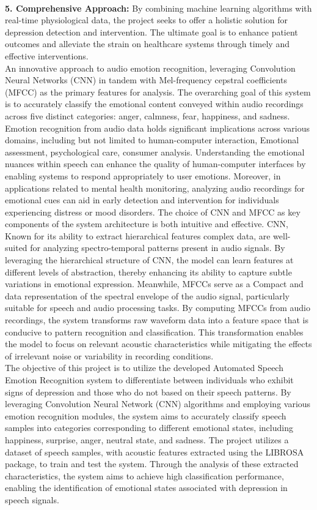 \\
\textbf{5. Comprehensive Approach:}
By combining machine learning algorithms with real-time physiological data, the project seeks to offer a holistic solution for depression detection and intervention.
The ultimate goal is to enhance patient outcomes and alleviate the strain on healthcare systems through timely and effective interventions.
\\
An innovative approach to audio emotion recognition, leveraging Convolution Neural Networks\cite{li2021survey} (CNN) in tandem with Mel-frequency cepstral coefficients (MFCC) as the primary features for analysis. The overarching goal of this system is to accurately classify the emotional content conveyed within audio recordings across five distinct categories: anger, calmness, fear, happiness, and sadness. Emotion recognition from audio data holds significant implications across various domains, including but not limited to human-computer interaction, Emotional assessment, psychological care, consumer analysis. Understanding the emotional nuances within speech can enhance the quality of human-computer interfaces by enabling systems to respond appropriately to user emotions. Moreover, in applications related to mental health monitoring, analyzing audio recordings for emotional cues can aid in early detection and intervention for individuals experiencing distress or mood disorders. The choice of CNN and MFCC as key components of the system architecture is both intuitive and effective. CNN, Known for its ability to extract hierarchical features complex data, are well-suited for analyzing spectro-temporal patterns present in audio signals. By leveraging the hierarchical structure of CNN, the model can learn  features at different levels of abstraction, thereby enhancing its ability to capture subtle variations in emotional expression. Meanwhile, MFCCs serve as a Compact and data representation of the spectral envelope of the audio signal, particularly suitable for speech and audio processing tasks. By computing MFCCs from audio recordings, the system transforms raw waveform data into a feature space that is conducive to pattern recognition and classification. This transformation enables the model to focus on relevant acoustic characteristics while mitigating the effects of irrelevant noise or variability in recording conditions.
\\
The objective of this project is to utilize the developed Automated Speech Emotion Recognition\cite{wani2021comprehensive} system to differentiate between individuals who exhibit signs of depression and those who do not based on their speech patterns. By leveraging Convolution Neural Network (CNN) algorithms and employing various emotion recognition modules, the system aims to accurately classify speech samples into categories corresponding to different emotional states, including happiness, surprise, anger, neutral state, and sadness. The project utilizes a dataset of speech samples, with acoustic features extracted using the LIBROSA package, to train and test the system. Through the analysis of these extracted characteristics, the system aims to achieve high classification performance, enabling the identification of emotional states associated with depression in speech signals.
